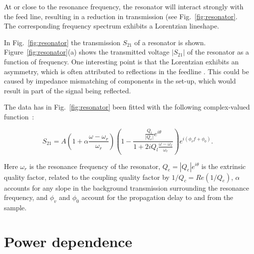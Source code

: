  At or close to the resonance frequency, the resonator will interact strongly with the feed line, resulting in a reduction in transmission (see Fig.~\ref{fig:resonator}. The corresponding frequency spectrum exhibits a Lorentzian lineshape.

  In Fig.~\ref{fig:resonator} the transmission $S_{21}$ of a resonator is shown. Figure~\ref{fig:resonator}(a) shows the transmitted voltage $|S_{21}|$ of the resonator as a function of frequency. One interesting point is that the Lorentzian exhibits an asymmetry, which is often attributed to reflections in the feedline \cite[p192]{Geerlings}. This could be caused by impedance mismatching of components in the set-up, which would result in part of the signal being reflected.

  The data has in Fig.~\ref{fig:resonator} been fitted with the following complex-valued function~\cite{bruno2015reducing}:

  \begin{equation}
    S_{21} =A \left( 1 + \alpha \frac{\omega-\omega_r}{\omega_r} \right)
    \left(1-\frac{\frac{Q_l}{\lvert Q_e \rvert}e^{i\theta}}{1+2iQ_l\frac{\omega-\omega_r}{\omega_r}}\right)e^{i\left(\phi_v f+\phi_0\right)}.
    \label{eq:THEhanger}
  \end{equation}

  Here $\omega_r$ is the resonance frequency of the resonator, $Q_e=\left|Q_e\right|e^{i\theta}$ is the extrinsic quality factor, related to the coupling quality factor by $1/Q_c=Re\left(1/Q_e\right)$, $\alpha$ accounts for any slope in the background transmission surrounding the resonance frequency, and $\phi_v$ and $\phi_0$ account for the propagation delay to and from the sample.

\section{Power dependence}
\label{sec:resonator:results:power_dependence}

